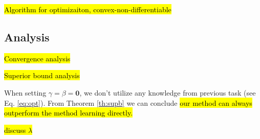 \hl{Algorithm for optimizaiton, convex-non-differentiable}


\subsection{Analysis}
\hl{Convergence analysis}

\hl{Superior bound analysis}


When setting $\gamma=\beta = \mathbf{0}$, we don't utilize any knowledge from previous task (see Eq. \eqref{eq:opt}). From Theorem \ref{th:supb} we can conclude \hl{our method can always outperform the method learning directly.}

\hl{discuss $\lambda$}